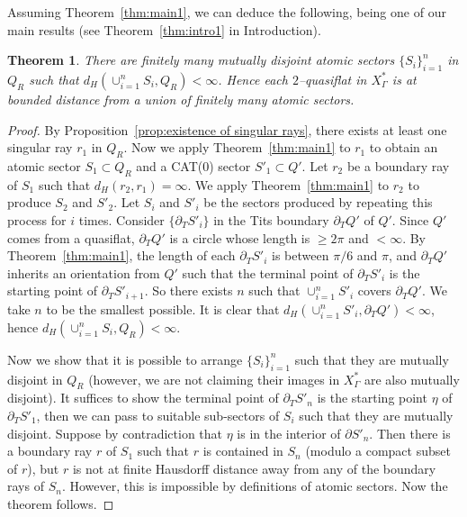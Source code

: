 \documentclass[11pt]{amsart}
\newtheorem{theorem}{Theorem}[section]
\theoremstyle{definition}
\newcommand{\Xa}{X^{\ast}}
\begin{document}
Assuming Theorem~\ref{thm:main1}, we can deduce the following, being one of our main results (see Theorem~\ref{thm:intro1} in Introduction).
\begin{theorem}
	\label{thm:main2}
	There are finitely many mutually disjoint atomic sectors $\{S_i\}_{i=1}^{n}$ in $Q_R$ such that $d_H(\cup_{i=1}^{n}S_i,Q_R)<\infty$. Hence each $2$--quasiflat in $\Xa_\Gamma$ is at bounded distance from a union of finitely many atomic sectors. 
\end{theorem}

\begin{proof}
	By Proposition~\ref{prop:existence of singular rays}, there exists at least one singular ray $r_1$ in $Q_R$. Now we apply Theorem~\ref{thm:main1} to $r_1$ to obtain an atomic sector $S_1\subset Q_R$ and a CAT(0) sector $S'_1\subset Q'$. Let $r_2$ be a boundary ray of $S_1$ such that $d_H(r_2,r_1)=\infty$. We apply Theorem~\ref{thm:main1} to $r_2$ to produce $S_2$ and $S'_2$. Let $S_i$ and $S'_i$ be the sectors produced by repeating this process for $i$ times. Consider $\{\partial_T S'_i\}$ in the Tits boundary $\partial_T Q'$ of $Q'$. Since $Q'$ comes from a quasiflat, $\partial_TQ'$ is a circle whose length is $\ge 2\pi$ and $<\infty$. By Theorem~\ref{thm:main1}, the length of each $\partial_T S'_i$ is between $\pi/6$ and $\pi$, and $\partial_T Q'$ inherits an orientation from $Q'$ such that the terminal point of $\partial_T S'_i$ is the starting point of $\partial_T S'_{i+1}$. So there exists $n$ such that $\cup_{i=1}^n S'_i$ covers $\partial_T Q'$. We take $n$ to be the smallest possible. It is clear that $d_H(\cup_{i=1}^n S'_i,\partial_T Q')<\infty$, hence $d_H(\cup_{i=1}^{n}S_i,Q_R)<\infty$. 
	
	Now we show that it is possible to arrange $\{S_i\}_{i=1}^n$ such that they are mutually disjoint in $Q_R$ (however, we are not claiming their images in $\Xa_\Gamma$ are also mutually disjoint). It suffices to show the terminal point of $\partial_T S'_n$ is the starting point $\eta$ of $\partial_T S'_1$, then we can pass to suitable sub-sectors of $S_i$ such that they are mutually disjoint. Suppose by contradiction that $\eta$ is in the interior of $\partial S'_n$. Then there is a boundary ray $r$ of $S_1$ such that $r$ is contained in $S_n$ (modulo a compact subset of $r$), but $r$ is not at finite Hausdorff distance away from any of the boundary rays of $S_n$. However, this is impossible by definitions of atomic sectors. Now the theorem follows.
\end{proof}
\end{document}
